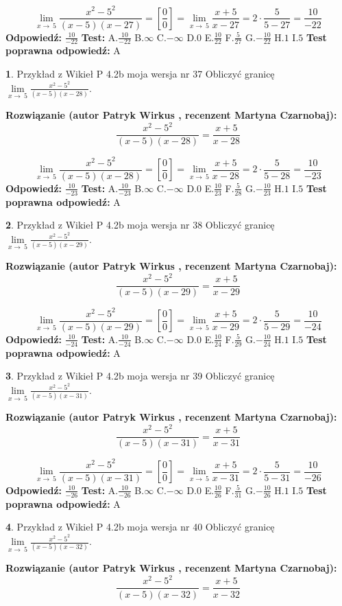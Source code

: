 \documentclass[12pt, a4paper]{article}
\theoremstyle{definition} %
\newtheorem{zad}{}
\newcommand{\zadStart}[1]{\begin{zad}#1\newline}
\newcommand{\zadStop}{\end{zad}}
\newcommand{\rozwStart}[2]{\noindent \textbf{Rozwiązanie (autor #1 , recenzent #2): }\newline}
\newcommand{\rozwStop}{\newline}
\newcommand{\odpStart}{\noindent \textbf{Odpowiedź:}\newline}
\newcommand{\odpStop}{\newline}
\newcommand{\testStart}{\noindent \textbf{Test:}\newline}
\newcommand{\testStop}{\newline}
\newcommand{\kluczStart}{\noindent \textbf{Test poprawna odpowiedź:}\newline}
\newcommand{\kluczStop}{\newline}
\begin{document}
$$\lim\limits_{x\to\ 5}\frac{x^{2}-5^{2}}{(x-5)(x-27)}=[\frac{0}{0}]=\lim\limits_{x\to\ 5}\frac{x+5}{x-27}=2 \cdot \frac{5}{5-27} = \frac{10}{-22}$$
\rozwStop
\odpStart
$\frac{10}{-22}$
\odpStop
\testStart
A.$\frac{10}{-22}$
B.$\infty$
C.$-\infty$
D.$0$
E.$\frac{10}{22}$
F.$\frac{5}{27}$
G.$-\frac{10}{22}$
H.$1$
I.$5$
\testStop
\kluczStart
A
\kluczStop



\zadStart{Przykład z Wikieł P 4.2b moja wersja nr 37}
Obliczyć granicę $\lim\limits_{x\to\ 5}\frac{x^{2}-5^{2}}{(x-5)(x-28)}$.
\zadStop
\rozwStart{Patryk Wirkus}{Martyna Czarnobaj}
$$\frac{x^{2}-5^{2}}{(x-5)(x-28)}=\frac{x+5}{x-28}$$

$$\lim\limits_{x\to\ 5}\frac{x^{2}-5^{2}}{(x-5)(x-28)}=[\frac{0}{0}]=\lim\limits_{x\to\ 5}\frac{x+5}{x-28}=2 \cdot \frac{5}{5-28} = \frac{10}{-23}$$
\rozwStop
\odpStart
$\frac{10}{-23}$
\odpStop
\testStart
A.$\frac{10}{-23}$
B.$\infty$
C.$-\infty$
D.$0$
E.$\frac{10}{23}$
F.$\frac{5}{28}$
G.$-\frac{10}{23}$
H.$1$
I.$5$
\testStop
\kluczStart
A
\kluczStop



\zadStart{Przykład z Wikieł P 4.2b moja wersja nr 38}
Obliczyć granicę $\lim\limits_{x\to\ 5}\frac{x^{2}-5^{2}}{(x-5)(x-29)}$.
\zadStop
\rozwStart{Patryk Wirkus}{Martyna Czarnobaj}
$$\frac{x^{2}-5^{2}}{(x-5)(x-29)}=\frac{x+5}{x-29}$$

$$\lim\limits_{x\to\ 5}\frac{x^{2}-5^{2}}{(x-5)(x-29)}=[\frac{0}{0}]=\lim\limits_{x\to\ 5}\frac{x+5}{x-29}=2 \cdot \frac{5}{5-29} = \frac{10}{-24}$$
\rozwStop
\odpStart
$\frac{10}{-24}$
\odpStop
\testStart
A.$\frac{10}{-24}$
B.$\infty$
C.$-\infty$
D.$0$
E.$\frac{10}{24}$
F.$\frac{5}{29}$
G.$-\frac{10}{24}$
H.$1$
I.$5$
\testStop
\kluczStart
A
\kluczStop



\zadStart{Przykład z Wikieł P 4.2b moja wersja nr 39}
Obliczyć granicę $\lim\limits_{x\to\ 5}\frac{x^{2}-5^{2}}{(x-5)(x-31)}$.
\zadStop
\rozwStart{Patryk Wirkus}{Martyna Czarnobaj}
$$\frac{x^{2}-5^{2}}{(x-5)(x-31)}=\frac{x+5}{x-31}$$

$$\lim\limits_{x\to\ 5}\frac{x^{2}-5^{2}}{(x-5)(x-31)}=[\frac{0}{0}]=\lim\limits_{x\to\ 5}\frac{x+5}{x-31}=2 \cdot \frac{5}{5-31} = \frac{10}{-26}$$
\rozwStop
\odpStart
$\frac{10}{-26}$
\odpStop
\testStart
A.$\frac{10}{-26}$
B.$\infty$
C.$-\infty$
D.$0$
E.$\frac{10}{26}$
F.$\frac{5}{31}$
G.$-\frac{10}{26}$
H.$1$
I.$5$
\testStop
\kluczStart
A
\kluczStop



\zadStart{Przykład z Wikieł P 4.2b moja wersja nr 40}
Obliczyć granicę $\lim\limits_{x\to\ 5}\frac{x^{2}-5^{2}}{(x-5)(x-32)}$.
\zadStop
\rozwStart{Patryk Wirkus}{Martyna Czarnobaj}
$$\frac{x^{2}-5^{2}}{(x-5)(x-32)}=\frac{x+5}{x-32}$$
\end{document}
